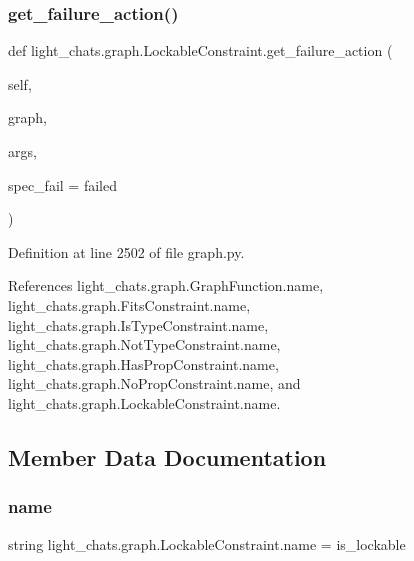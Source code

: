 \subsubsection{\texorpdfstring{get\+\_\+failure\+\_\+action()}{get\_failure\_action()}}
{\footnotesize\ttfamily def light\+\_\+chats.\+graph.\+Lockable\+Constraint.\+get\+\_\+failure\+\_\+action (\begin{DoxyParamCaption}\item[{}]{self,  }\item[{}]{graph,  }\item[{}]{args,  }\item[{}]{spec\+\_\+fail = {\ttfamily \textquotesingle{}failed\textquotesingle{}} }\end{DoxyParamCaption})}



Definition at line 2502 of file graph.\+py.



References light\+\_\+chats.\+graph.\+Graph\+Function.\+name, light\+\_\+chats.\+graph.\+Fits\+Constraint.\+name, light\+\_\+chats.\+graph.\+Is\+Type\+Constraint.\+name, light\+\_\+chats.\+graph.\+Not\+Type\+Constraint.\+name, light\+\_\+chats.\+graph.\+Has\+Prop\+Constraint.\+name, light\+\_\+chats.\+graph.\+No\+Prop\+Constraint.\+name, and light\+\_\+chats.\+graph.\+Lockable\+Constraint.\+name.



\subsection{Member Data Documentation}
\mbox{\label{classlight__chats_1_1graph_1_1LockableConstraint_a7b69d1ba2cd8f2b909299bb5faabc4a6}} 
\subsubsection{\texorpdfstring{name}{name}}
{\footnotesize\ttfamily string light\+\_\+chats.\+graph.\+Lockable\+Constraint.\+name = \textquotesingle{}is\+\_\+lockable\textquotesingle{}\hspace{0.3cm}{\ttfamily [static]}}



